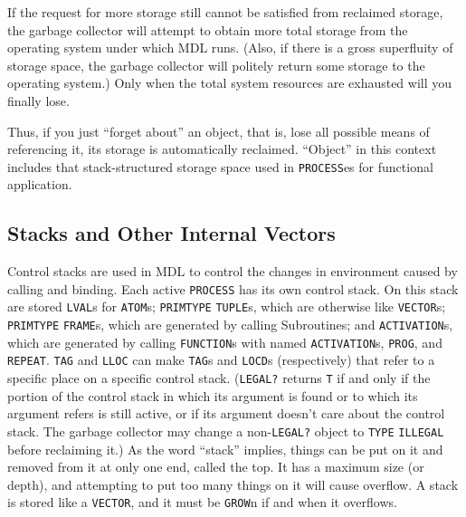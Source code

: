 \documentclass[a4paper]{scrbook}
\begin{document}
If the request for more storage still cannot be satisfied from reclaimed storage, the garbage collector will attempt to
obtain more total storage from the operating system under which MDL runs. (Also, if there is a gross superfluity of storage
space, the garbage collector will politely return some storage to the operating system.) Only when the total system
resources are exhausted will you finally lose.

Thus, if you just ``forget about'' an object, that is, lose all possible means of referencing it, its storage is
automatically reclaimed. ``Object'' in this context includes that stack-structured storage space used in \texttt{PROCESS}es
for functional application.

\subsection{Stacks and Other Internal Vectors}\label{stacks-and-other-internal-vectors}

Control stacks are used in MDL to control the changes in environment caused by calling and binding. Each active
\texttt{PROCESS} has its own control stack. On this stack are stored
\texttt{LVAL}s for \texttt{ATOM}s; \texttt{PRIMTYPE} \texttt{TUPLE}s, which are
otherwise like \texttt{VECTOR}s; \texttt{PRIMTYPE} \texttt{FRAME}s, which are generated by calling
Subroutines; and \texttt{ACTIVATION}s, which are generated by calling \texttt{FUNCTION}s with
named \texttt{ACTIVATION}s, \texttt{PROG}, and \texttt{REPEAT}. \texttt{TAG} and
\texttt{LLOC} can make \texttt{TAG}s and \texttt{LOCD}s (respectively) that refer
to a specific place on a specific control stack. (\texttt{LEGAL?} returns \texttt{T} if and
only if the portion of the control stack in which its argument is found or to which its argument refers is still active, or
if its argument doesn't care about the control stack. The garbage collector may change a non-\texttt{LEGAL?} object to
\texttt{TYPE} \texttt{ILLEGAL} before reclaiming it.) As the word
``stack'' implies, things can be put on it and removed from it at only one end, called the top. It has a maximum size (or
depth), and attempting to put too many things on it will cause overflow. A stack is stored like a \texttt{VECTOR}, and it
must be \texttt{GROW}n if and when it overflows.
\end{document}
